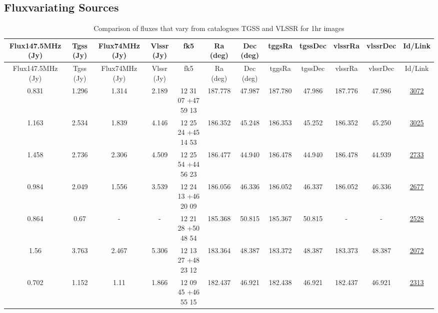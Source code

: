 \documentclass{article}
\begin{document}
\begin{landscape}

\section{Fluxvariating Sources}\label{varsection:KmeulenTrap4P23:1hr}

\begin{longtable}{c|c|c|c|c|c|c|c|c|c|c|c} 
\toprule 
Flux147.5MHz (Jy) & Tgss (Jy) & Flux74MHz (Jy)& Vlssr (Jy) & fk5 & Ra (deg) & Dec (deg) &tggsRa&tgssDec&vlssrRa&vlssrDec& Id/Link \\\midrule 
\endfirsthead 
\toprule 
Flux147.5MHz (Jy) & Tgss (Jy) & Flux74MHz (Jy)& Vlssr (Jy)& fk5 & Ra (deg) & Dec (deg)  &tggsRa&tgssDec&vlssrRa&vlssrDec& Id/Link \\\midrule 
\endhead 
\bottomrule 
\endfoot 
\bottomrule
\caption{ Comparison of fluxes that vary from catalogues TGSS and VLSSR for 1hr images} 
\endlastfoot
\label{KmeulenTrap4P23:1hr:tablevar}
0.831 & 1.296 & 1.314 & 2.189 & 12 31 07 +47 59 13 &  187.778 & 47.987 &  187.780 & 47.986 & 187.776 & 47.986 & \href{http://banana.transientskp.org/r4/vlo_KmeulenTrap4P23/runningcatalog/3072}{3072}  \\
1.163 & 2.534 & 1.839 & 4.146 & 12 25 24 +45 14 53 &  186.352 & 45.248 &  186.353 & 45.252 & 186.352 & 45.250 & \href{http://banana.transientskp.org/r4/vlo_KmeulenTrap4P23/runningcatalog/3025}{3025}  \\
1.458 & 2.736 & 2.306 & 4.509 & 12 25 54 +44 56 23 &  186.477 & 44.940 &  186.478 & 44.940 & 186.478 & 44.939 & \href{http://banana.transientskp.org/r4/vlo_KmeulenTrap4P23/runningcatalog/2733}{2733}  \\
0.984 & 2.049 & 1.556 & 3.539 & 12 24 13 +46 20 09 &  186.056 & 46.336 &  186.052 & 46.337 & 186.052 & 46.336 & \href{http://banana.transientskp.org/r4/vlo_KmeulenTrap4P23/runningcatalog/2677}{2677}  \\
0.864 & 0.67 & - & - & 12 21 28 +50 48 54 &  185.368 & 50.815 &  185.367 & 50.815 & - & - & \href{http://banana.transientskp.org/r4/vlo_KmeulenTrap4P23/runningcatalog/2528}{2528}  \\
1.56 & 3.763 & 2.467 & 5.306 & 12 13 27 +48 23 12 &  183.364 & 48.387 &  183.372 & 48.387 & 183.373 & 48.387 & \href{http://banana.transientskp.org/r4/vlo_KmeulenTrap4P23/runningcatalog/2072}{2072}  \\
0.702 & 1.152 & 1.11 & 1.866 & 12 09 45 +46 55 15 &  182.437 & 46.921 &  182.438 & 46.921 & 182.437 & 46.921 & \href{http://banana.transientskp.org/r4/vlo_KmeulenTrap4P23/runningcatalog/2313}{2313}  \\

\end{longtable}
\end{landscape}
\end{document}

